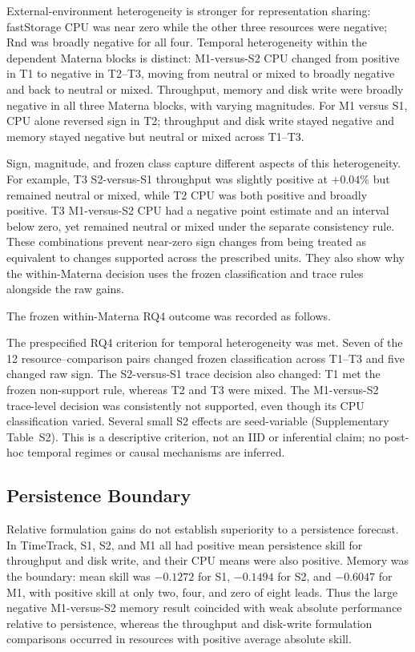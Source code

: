 \documentclass[a4paper,fleqn]{cas-dc}
\begin{document}
External-environment heterogeneity is stronger for representation sharing: fastStorage
CPU was near zero while the other three resources were negative; Rnd was
broadly negative for all four. Temporal heterogeneity within the dependent
Materna blocks is distinct: M1-versus-S2 CPU changed from positive in T1 to
negative in T2--T3, moving from neutral or mixed to broadly negative and back
to neutral or mixed. Throughput, memory and disk write were broadly negative
in all three Materna blocks, with varying magnitudes. For M1 versus S1, CPU
alone reversed sign in T2; throughput and disk write stayed negative and
memory stayed negative but neutral or mixed across T1--T3.

Sign, magnitude, and frozen class capture different aspects of this
heterogeneity. For example, T3 S2-versus-S1 throughput was slightly positive at
$+0.04\%$ but remained neutral or mixed, while T2 CPU was both positive and
broadly positive. T3 M1-versus-S2 CPU had a negative point estimate and an
interval below zero, yet remained neutral or mixed under the separate
consistency rule. These combinations prevent near-zero sign changes from being
treated as equivalent to changes supported across the prescribed units. They
also show why the within-Materna decision uses the frozen classification and
trace rules alongside the raw gains.

The frozen within-Materna RQ4 outcome was recorded as follows.

\noindent The prespecified RQ4 criterion for temporal heterogeneity was met.
Seven of the 12
resource--comparison pairs changed frozen classification across T1--T3 and
five changed raw sign. The S2-versus-S1 trace decision also changed: T1 met the
frozen non-support rule, whereas T2 and T3 were mixed. The M1-versus-S2
trace-level decision was consistently not supported, even though its CPU
classification varied. Several small S2 effects are seed-variable
(Supplementary Table~S2). This is a descriptive criterion, not an IID or
inferential claim; no post-hoc temporal regimes or causal mechanisms are
inferred.

\subsection{Persistence Boundary}
\label{sec:results-persistence}

Relative formulation gains do not establish superiority to a persistence
forecast. In TimeTrack, S1, S2, and M1 all had positive mean persistence skill
for throughput and disk write, and their CPU means were also positive. Memory
was the boundary: mean skill was $-0.1272$ for S1, $-0.1494$ for S2, and
$-0.6047$ for M1, with positive skill at only two, four, and zero of eight
leads. Thus the large negative M1-versus-S2 memory result coincided with weak
absolute performance relative to persistence, whereas the throughput and
disk-write formulation comparisons occurred in resources with positive
average absolute skill.
\end{document}
